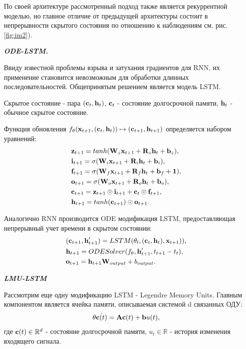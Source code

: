 По своей архитектуре рассмотренный подход также является рекуррентной моделью, но главное отличие от предыдущей архитектуры состоит в непрерывности скрытого состояния по отношению к наблюдениям см. рис. \ref{fig:im2}).

\textit{\textbf{ODE-LSTM.}}

Ввиду известной проблемы взрыва и затухания градиентов для RNN, их применение становится невозможным для обработки длинных последовательностей. Общепринятым решением является модель LSTM. 

Скрытое состояние - пара $(\textbf{c}_t, \textbf{h}_t)$, $\textbf{c}_t$ - состояние долгосрочной памяти, $\textbf{h}_t$ - обычное скрытое состояние.

Функция обновления $f_{\theta}(\textbf{x}_{t+1}, (\textbf{c}_t, \textbf{h}_t)) \mapsto (\textbf{c}_{t+1}, \textbf{h}_{t+1})$ определяется набором уравнений:
\begin{align*}
    & \textbf{z}_{t+1} = tanh(\textbf{W}_z \textbf{x}_{t+1} + \textbf{R}_z\textbf{h}_t+\textbf{b}_z),\\
    & \textbf{i}_{t+1} = \sigma(\textbf{W}_i\textbf{x}_{t+1} + \textbf{R}_i \textbf{h}_t + \textbf{b}_i),\\
    & \textbf{f}_{t+1} = \sigma(\textbf{W}_f\textbf{x}_{t+1} + \textbf{R}_f \textbf{h}_t + \textbf{b}_f + \textbf{1}),\\
    & \textbf{o}_{t+1} = \sigma(\textbf{W}_o\textbf{x}_{t+1} + \textbf{R}_o \textbf{h}_t + \textbf{b}_o),\\
    & \textbf{c}_{t+1} = \textbf{z}_{t+1}\odot \textbf{i}_{t+1} + \textbf{c}_t\odot \textbf{f}_{t+1},\\
    & \textbf{h}_{t+1} = tanh(\textbf{c}_{t+1})\odot \textbf{o}_{t+1}.
\end{align*}

Аналогично RNN производится ODE модификация LSTM, предоставляющая непрерывный учет времени в скрытом состоянии:
\begin{align*}
    & (\textbf{c}_{t+1}, \textbf{h}_{t+1}') = LSTM(\theta_l, (\textbf{c}_t, \textbf{h}_t), \textbf{x}_{t+1})),\\
    & \textbf{h}_{t+1} = ODESolver(f_{\theta}, \textbf{h}_{t+1}', t_{t+1} - t_{t}),\\
    & \textbf{o}_{t+1} = \textbf{h}_{t+1}\textbf{W}_{output} + b_{output}.
\end{align*}

\textit{\textbf{LMU-LSTM}}

Рассмотрим еще одну модификацию LSTM - Legendre Memory Units. Главным компонентом является ячейка памяти, описываемая системой d связанных ОДУ:
\begin{equation*}
    \theta \dot{\textbf{c}(t)} = \textbf{A}\textbf{c}(t) + \textbf{b}u(t),
\end{equation*}
где $\textbf{c}(t)\in \mathbb{R}^d$ - состояние долгосрочной памяти,
$u_t \in \mathbb{R}$ - история изменения входящего сигнала.

